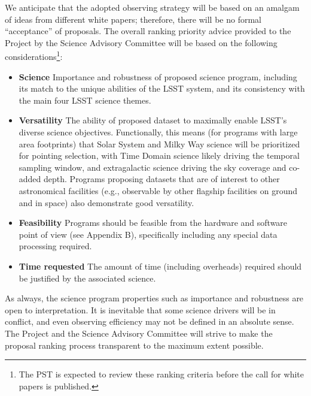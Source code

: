 \documentclass[DM,lsstdraft,toc,usenatbib]{lsstdoc}
\begin{document}
We anticipate that the adopted observing strategy will be based on an amalgam of ideas from 
different white papers; therefore, there will be no formal ``acceptance'' of proposals. The
overall ranking priority advice provided to the Project by the Science Advisory Committee 
will be based on the following considerations\footnote{The PST is expected to review these ranking criteria before the call for white papers is published.}: 
\begin{itemize}
\item {\bf Science} Importance and robustness of proposed science program, including 
           its match to the unique abilities of the LSST system, and its consistency with the 
           main four LSST science themes. 
\item {\bf Versatility} The ability of proposed dataset to maximally enable LSST's diverse science objectives. 
          Functionally, this means (for programs with large area footprints) that Solar System and Milky Way science will be prioritized for pointing selection,
          with Time Domain science likely driving the temporal sampling window, and extragalactic science driving 
          the sky coverage and co-added depth. Programs proposing datasets that are of interest to other astronomical 
          facilities (e.g., observable by other flagship facilities on ground and in space) also demonstrate good versatility.
\item {\bf Feasibility} Programs should be feasible from the hardware and software point of view (see Appendix B),
         specifically including any special data processing required.
\item {\bf Time requested} The amount of time (including overheads) required should be justified by 
        the associated science. 
\end{itemize} 

As always, the science program properties such as importance and robustness are open
to interpretation. It is inevitable that some science drivers will be in conflict, and even
observing efficiency may not be defined in an absolute sense. The Project and the Science Advisory 
Committee will strive to make the proposal ranking process transparent to the maximum extent possible. 
\end{document}
